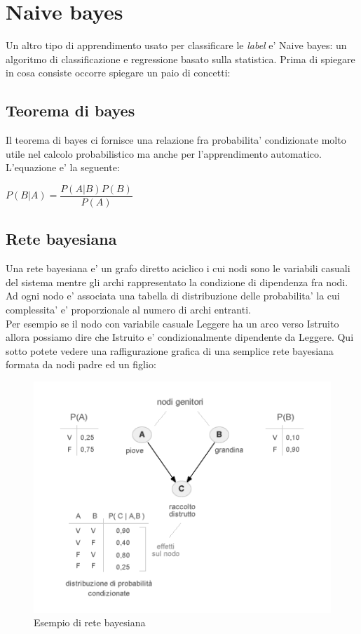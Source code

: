 \section{Naive bayes}
Un altro tipo di apprendimento usato per classificare le \textit{label} e' Naive bayes: un algoritmo di classificazione e regressione basato sulla statistica. Prima di spiegare in cosa consiste occorre spiegare un paio di concetti:
\subsection{Teorema di bayes}
Il teorema di bayes ci fornisce una relazione fra probabilita' condizionate molto utile nel calcolo probabilistico ma anche per l'apprendimento automatico. L'equazione e' la seguente:
\begin{center}
	$P(B|A) = \dfrac{P(A|B)P(B)}{P(A)}$
\end{center}
\subsection{Rete bayesiana}
Una rete bayesiana e' un grafo diretto aciclico i cui nodi sono le variabili casuali del sistema mentre gli archi rappresentato la condizione di dipendenza fra nodi.
 Ad ogni nodo e' associata una tabella di distribuzione delle probabilita' la cui complessita' e' proporzionale al numero di archi entranti.\\ Per esempio se il nodo con variabile casuale Leggere ha un arco verso Istruito allora possiamo dire che Istruito e' condizionalmente dipendente da Leggere. Qui sotto potete vedere una raffigurazione grafica di una semplice rete bayesiana formata da nodi padre ed un figlio:
\begin{figure}[H]
	\centering
	\includegraphics[width=0.7\linewidth]{img/rete-bayesiana-grafo.png}
	\caption{Esempio di rete bayesiana}
	\label{fig:rete-bayesiana-grafo}
\end{figure}
\medskip
